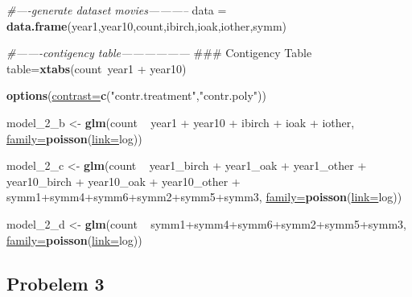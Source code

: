 \documentclass[]{article}
\newenvironment{Shaded}{\begin{snugshade}}{\end{snugshade}}
\newcommand{\KeywordTok}[1]{\textcolor[rgb]{0.26,0.66,0.93}{\textbf{{#1}}}}
\newcommand{\DataTypeTok}[1]{\textcolor[rgb]{0.74,0.68,0.62}{\underline{{#1}}}}
\newcommand{\StringTok}[1]{\textcolor[rgb]{0.02,0.61,0.04}{{#1}}}
\newcommand{\CommentTok}[1]{\textcolor[rgb]{0.00,0.40,1.00}{\textit{{#1}}}}
\newcommand{\NormalTok}[1]{\textcolor[rgb]{0.74,0.68,0.62}{{#1}}}
\begin{document}
\begin{Shaded}
\begin{Highlighting}[]
\CommentTok{#----generate dataset movies-----------}
\NormalTok{data =}\StringTok{ }\KeywordTok{data.frame}\NormalTok{(year1,year10,count,ibirch,ioak,iother,symm)}

\CommentTok{#-------contigency table------------------}
\NormalTok{### Contigency Table}
\NormalTok{table=}\KeywordTok{xtabs}\NormalTok{(count~year1 +}\StringTok{ }\NormalTok{year10)}

\KeywordTok{options}\NormalTok{(}\DataTypeTok{contrast=}\KeywordTok{c}\NormalTok{(}\StringTok{"contr.treatment"}\NormalTok{,}\StringTok{"contr.poly"}\NormalTok{))}

\NormalTok{model_2_b <-}\StringTok{ }\KeywordTok{glm}\NormalTok{(count ~}\StringTok{ }\NormalTok{year1 +}\StringTok{ }\NormalTok{year10 +}\StringTok{ }\NormalTok{ibirch +}\StringTok{ }\NormalTok{ioak +}\StringTok{ }\NormalTok{iother, }\DataTypeTok{family=}\KeywordTok{poisson}\NormalTok{(}\DataTypeTok{link=}\NormalTok{log))}

\NormalTok{model_2_c <-}\StringTok{ }\KeywordTok{glm}\NormalTok{(count ~}\StringTok{ }\NormalTok{year1_birch +}\StringTok{ }\NormalTok{year1_oak +}\StringTok{ }\NormalTok{year1_other +}
\StringTok{                     }\NormalTok{year10_birch +}\StringTok{ }\NormalTok{year10_oak +}\StringTok{ }\NormalTok{year10_other +}\StringTok{ }
\StringTok{                     }\NormalTok{symm1+symm4+symm6+symm2+symm5+symm3,}
                     \DataTypeTok{family=}\KeywordTok{poisson}\NormalTok{(}\DataTypeTok{link=}\NormalTok{log))}

\NormalTok{model_2_d <-}\StringTok{ }\KeywordTok{glm}\NormalTok{(count ~}\StringTok{ }\NormalTok{symm1+symm4+symm6+symm2+symm5+symm3,}
                     \DataTypeTok{family=}\KeywordTok{poisson}\NormalTok{(}\DataTypeTok{link=}\NormalTok{log))}
\end{Highlighting}
\end{Shaded}

\subsection{Probelem 3}\label{probelem-3}
\end{document}
